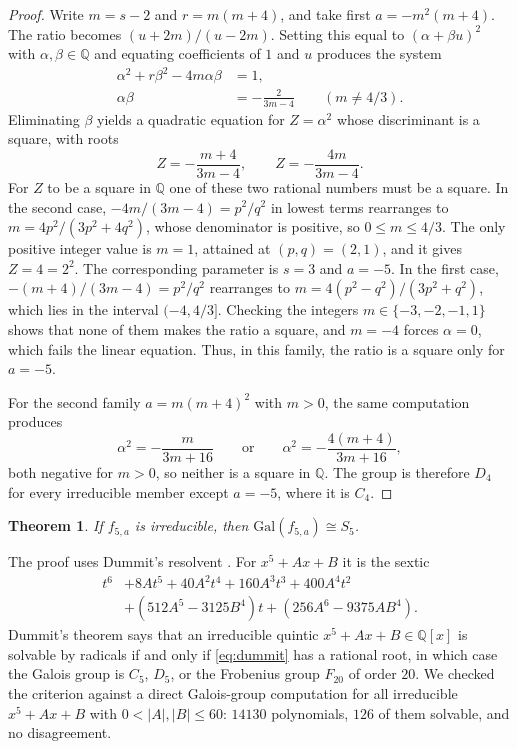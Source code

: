 \documentclass[11pt]{article}
\newtheorem{theorem}{Theorem}
\theoremstyle{definition}
\theoremstyle{remark}
\newcommand{\Q}{\mathbb{Q}}
\newcommand{\Gal}{\mathrm{Gal}}
\begin{document}
\begin{proof}
Write $m=s-2$ and $r=m(m+4)$, and take first $a=-m^{2}(m+4)$. The ratio becomes
$(u+2m)/(u-2m)$. Setting this equal to $(\alpha+\beta u)^{2}$ with
$\alpha,\beta\in\Q$ and equating coefficients of $1$ and $u$ produces the system
\begin{align*}
\alpha^{2}+r\beta^{2}-4m\alpha\beta&=1,\\
\alpha\beta&=-\frac{2}{3m-4}\qquad(m\neq 4/3).
\end{align*}
Eliminating $\beta$ yields a quadratic equation for $Z=\alpha^{2}$ whose
discriminant is a square, with roots
\[
Z=-\frac{m+4}{3m-4},\qquad Z=-\frac{4m}{3m-4}.
\]
For $Z$ to be a square in $\Q$ one of these two rational numbers must be a square.
In the second case, $-4m/(3m-4)=p^{2}/q^{2}$ in lowest terms rearranges to
$m=4p^{2}/(3p^{2}+4q^{2})$, whose denominator is positive, so $0\le m\le 4/3$.
The only positive integer value is $m=1$, attained at $(p,q)=(2,1)$, and it gives
$Z=4=2^{2}$. The corresponding parameter is $s=3$ and $a=-5$. In the first case,
$-(m+4)/(3m-4)=p^{2}/q^{2}$ rearranges to
$m=4(p^{2}-q^{2})/(3p^{2}+q^{2})$, which lies in the interval $(-4,4/3]$. Checking
the integers $m\in\{-3,-2,-1,1\}$ shows that none of them makes the ratio a
square, and $m=-4$ forces $\alpha=0$, which fails the linear equation. Thus, in
this family, the ratio is a square only for $a=-5$.

For the second family $a=m(m+4)^{2}$ with $m>0$, the same computation produces
\[
\alpha^{2}=-\frac{m}{3m+16}\qquad\text{or}\qquad
\alpha^{2}=-\frac{4(m+4)}{3m+16},
\]
both negative for $m>0$, so neither is a square in $\Q$. The group is therefore
$D_4$ for every irreducible member except $a=-5$, where it is $C_4$.
\end{proof}

\begin{theorem}\label{thm:gal5}
If $f_{5,a}$ is irreducible, then $\Gal(f_{5,a})\cong S_5$.
\end{theorem}

The proof uses Dummit's resolvent \cite{Dum}. For $x^{5}+Ax+B$ it is the sextic
\begin{equation}\label{eq:dummit}
\begin{aligned}
t^{6}&+8At^{5}+40A^{2}t^{4}+160A^{3}t^{3}+400A^{4}t^{2}\\
&+(512A^{5}-3125B^{4})t+(256A^{6}-9375AB^{4}).
\end{aligned}
\end{equation}
Dummit's theorem says that an irreducible quintic $x^{5}+Ax+B\in\Q[x]$ is
solvable by radicals if and only if \eqref{eq:dummit} has a rational root, in
which case the Galois group is $C_5$, $D_5$, or the Frobenius group $F_{20}$ of
order $20$. We checked the criterion against a direct Galois-group computation
for all irreducible $x^{5}+Ax+B$ with $0<|A|,|B|\le 60$: $14130$ polynomials,
$126$ of them solvable, and no disagreement.
\end{document}
